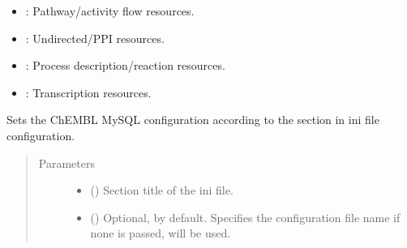 \documentclass[letterpaper,10pt,english]{sphinxmanual}
\begin{document}
\begin{fulllineitems}
\begin{fulllineitems}
\begin{itemize}
\item {} 
: Pathway/activity flow resources.

\item {} 
: Undirected/PPI resources.

\item {} 
: Process description/reaction resources.

\item {} 
: Transcription resources.

\end{itemize}

\end{fulllineitems}


\begin{fulllineitems}
\label{\detokenize{main:pypath.main.PyPath.set_chembl_mysql}}
Sets the ChEMBL MySQL configuration according to the 
section in  ini file configuration.
\begin{quote}\begin{description}
\item[{Parameters}] \leavevmode\begin{itemize}
\item {} 
 () \textendash{} Section title of the ini file.

\item {} 
 () \textendash{} Optional,  by default. Specifies the configuration
file name if none is passed, 
will be used.

\end{itemize}

\end{description}\end{quote}

\end{fulllineitems}



\end{fulllineitems}
\end{document}
